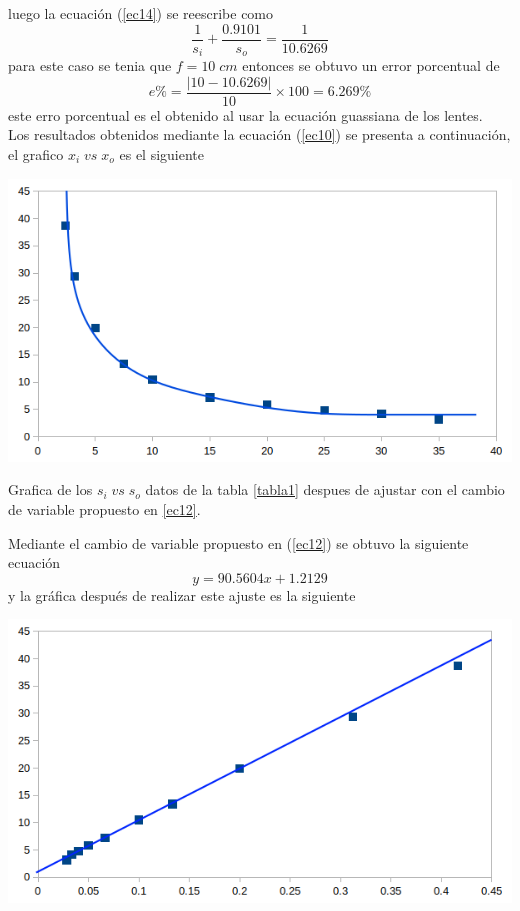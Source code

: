\documentclass[13,twocolumn,letterpaper]{article}
\newenvironment{Figure}{\par\medskip\noindent\minipage{\linewidth}}{\endminipage\par\medskip}
\begin{document}
\begin{multicols}{2}
luego la ecuación (\ref{ec14}) se reescribe como 
\begin{equation}
\dfrac{1}{s_{i}}+\dfrac{0.9101}{s_{o}}=\dfrac{1}{10.6269}
\end{equation}
para este caso se tenia que $f=10 \;cm$ entonces se obtuvo un error porcentual de 
$$e\%=\dfrac{|10-10.6269|}{10}\times 100= 6.269\%$$
este erro porcentual es el obtenido al usar la ecuación guassiana de los lentes.\\
Los resultados obtenidos mediante la ecuación (\ref{ec10}) se presenta a continuación, el grafico $x_{i}\;vs\;x_{o}$ es el siguiente
\begin{Figure}
	\centering
	\includegraphics[width=\linewidth]{fig11}
	\caption{\footnotesize{Grafica de los $s_{i}\;vs\;s_{o}$ datos de la tabla \ref{tabla1} despues de ajustar con el cambio de variable propuesto en \ref{ec12}.}}
	\label{fig:fig-11}
\end{Figure} 
Mediante el cambio de variable propuesto en (\ref{ec12}) se obtuvo la siguiente ecuación
\begin{equation}\label{ec21}
y=90.5604x+1.2129
\end{equation}
 y la gráfica después de realizar este ajuste es la siguiente
	\begin{Figure}
	\centering
	\includegraphics[width=\linewidth]{fig12}

\end{Figure}
\end{multicols}
\end{document}
